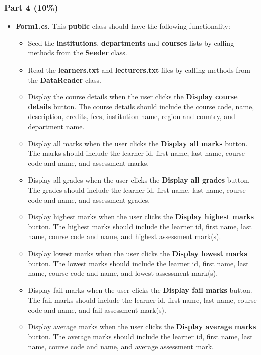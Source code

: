 \documentclass{article}
\begin{document}
\subsubsection*{Part 4 (10\%)}
\begin{itemize}
    \item \textbf{Form1.cs}. This \textbf{public} class should have the following functionality:
    \begin{itemize}
        \item Seed the \textbf{institutions}, \textbf{departments} and \textbf{courses} lists by calling methods from the \textbf{Seeder} class.
        \item Read the \textbf{learners.txt} and \textbf{lecturers.txt} files by calling methods from the \textbf{DataReader} class. 
        \item Display the course details when the user clicks the \textbf{Display course details} button. The course details should include the course code, name, description, credits, fees, institution name, region and country, and department name.
        \item Display all marks when the user clicks the \textbf{Display all marks} button. The marks should include the learner id, first name, last name, course code and name, and assessment marks.
        \item Display all grades when the user clicks the \textbf{Display all grades} button. The grades should include the learner id, first name, last name, course code and name, and assessment grades.
        \item Display highest marks when the user clicks the \textbf{Display highest marks} button. The highest marks should include the learner id, first name, last name, course code and name, and highest assessment mark(s).
        \item Display lowest marks when the user clicks the \textbf{Display lowest marks} button. The lowest marks should include the learner id, first name, last name, course code and name, and lowest assessment mark(s).
        \item Display fail marks when the user clicks the \textbf{Display fail marks} button. The fail marks should include the learner id, first name, last name, course code and name, and fail assessment mark(s).
        \item Display average marks when the user clicks the \textbf{Display average marks} button. The average marks should include the learner id, first name, last name, course code and name, and average assessment mark.

\end{itemize}
\end{itemize}
\end{document}
